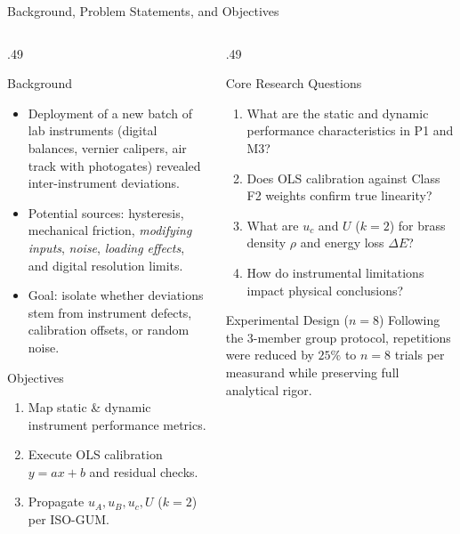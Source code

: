 \documentclass[aspectratio=169,10pt]{beamer}
\newcommand{\xs}{\fontsize{7.1}{9}\selectfont}
\newcommand{\uc}{u_{c}}
\newcommand{\uA}{u_{A}}
\newcommand{\uB}{u_{B}}
\begin{document}
\begin{frame}{Background, Problem Statements, and Objectives}
\begin{columns}[T,onlytextwidth]
\begin{column}{.49\textwidth}
\begin{block}{Background}\xs
\begin{itemize}
\item Deployment of a new batch of lab instruments (digital balances, vernier calipers, air track with photogates) revealed inter-instrument deviations.
\item Potential sources: hysteresis, mechanical friction, \textit{modifying inputs}, \textit{noise}, \textit{loading effects}, and digital resolution limits.
\item Goal: isolate whether deviations stem from instrument defects, calibration offsets, or random noise.
\end{itemize}
\end{block}
\begin{exampleblock}{Objectives}\xs
\begin{enumerate}
\item Map static \& dynamic instrument performance metrics.
\item Execute OLS calibration $y=ax+b$ and residual checks.
\item Propagate $\uA, \uB, \uc, U$ ($k=2$) per ISO-GUM.
\end{enumerate}
\end{exampleblock}
\end{column}

\begin{column}{.49\textwidth}
\begin{block}{Core Research Questions}\xs
\begin{enumerate}
\item What are the static and dynamic performance characteristics in P1 and M3?
\item Does OLS calibration against Class F2 weights confirm true linearity?
\item What are $\uc$ and $U$ ($k=2$) for brass density $\rho$ and energy loss $\Delta E$?
\item How do instrumental limitations impact physical conclusions?
\end{enumerate}
\end{block}
\begin{alertblock}{Experimental Design ($n=8$)}\xs
Following the 3-member group protocol, repetitions were reduced by $25\%$ to $n=8$ trials per measurand while preserving full analytical rigor.
\end{alertblock}
\end{column}
\end{columns}
\end{frame}
\end{document}
